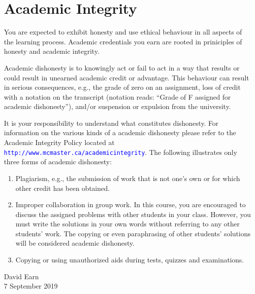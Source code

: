 \documentclass[12pt]{article}
\newcommand{\url}[1]{{\tt\textcolor{blue}{#1}}}
\begin{document}
\section*{Academic Integrity}

You are expected to exhibit honesty and use ethical behaviour in all aspects of the learning process. Academic credentials you earn are rooted in priniciples of honesty and academic integrity.

Academic dishonesty is to knowingly act or fail to act in a way that results or could result in unearned academic credit or advantage.  This behaviour can result in serious consequences, e.g., the grade of zero on an assignment, loss of credit with a notation on the transcript (notation reads: ``Grade of F assigned for academic dishonesty''), and/or suspension or expulsion from the university.

It is your responsibility to understand what constitutes dishonesty.  For information on the various kinds of a academic dishonesty please refer to the Academic Integrity Policy located at \url{http://www.mcmaster.ca/academicintegrity}.  The following illustrates only three forms of academic dishonesty:
\begin{enumerate}\addtolength{\itemsep}{-0.5\baselineskip}

\item Plagiarism, e.g., the submission of work that is not one's own or for which other credit has been obtained.

\item Improper collaboration in group work. In this course, you are encouraged to discuss the assigned problems with other students in your class. However, you must write the solutions in your own words without referring to any other students' work. The copying or even paraphrasing of other students' solutions will be considered academic dishonesty.

\item Copying or using unauthorized aids during tests, quizzes and examinations.

\end{enumerate}

\bigskip \bigskip
\noindent
David Earn\\
7 September 2019
\end{document}
